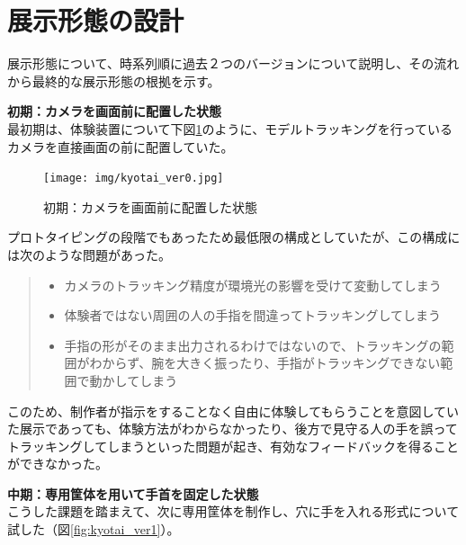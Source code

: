 \section{展示形態の設計}
展示形態について、時系列順に過去２つのバージョンについて説明し、その流れから最終的な展示形態の根拠を示す。

\textbf{初期：カメラを画面前に配置した状態}\\
最初期は、体験装置について下図\ref{fig:kyotai_ver0}のように、モデルトラッキングを行っているカメラを直接画面の前に配置していた。
\begin{figure}[H]
  \centering
  \texttt{[image: img/kyotai\_ver0.jpg]}
  \caption{初期：カメラを画面前に配置した状態}
  \label{fig:kyotai_ver0}
\end{figure}

プロトタイピングの段階でもあったため最低限の構成としていたが、この構成には次のような問題があった。
\begin{quote}
  \begin{itemize}
    \item カメラのトラッキング精度が環境光の影響を受けて変動してしまう
    \item 体験者ではない周囲の人の手指を間違ってトラッキングしてしまう
    \item 手指の形がそのまま出力されるわけではないので、トラッキングの範囲がわからず、腕を大きく振ったり、手指がトラッキングできない範囲で動かしてしまう
  \end{itemize}
\end{quote}

このため、制作者が指示をすることなく自由に体験してもらうことを意図していた展示であっても、体験方法がわからなかったり、後方で見守る人の手を誤ってトラッキングしてしまうといった問題が起き、有効なフィードバックを得ることができなかった。

\textbf{中期：専用筐体を用いて手首を固定した状態}\\
こうした課題を踏まえて、次に専用筐体を制作し、穴に手を入れる形式について試した（図\ref{fig:kyotai_ver1}）。

